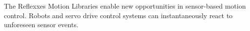 The Reflexxes Motion Libraries enable new opportunities in sensor-\/based motion control. Robots and servo drive control systems can instantaneously react to unforeseen sensor events. 